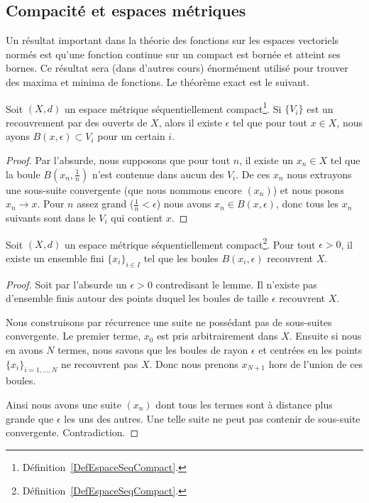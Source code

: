 \subsection{Compacité et espaces métriques}

Un résultat important dans la théorie des fonctions sur les espaces vectoriels normés est qu'une fonction continue sur un compact est bornée et atteint ses bornes. Ce résultat sera (dans d'autres cours) énormément utilisé pour trouver des maxima et minima de fonctions. Le théorème exact est le suivant.

\begin{lemma}    \label{LemQFXOWyx}
    Soit \( (X,d)\) un espace métrique séquentiellement compact\footnote{Définition~\ref{DefEspaceSeqCompact}.}. Si \( \{ V_i \}\) est un recouvrement par des ouverts de \( X\), alors il existe \( \epsilon\) tel que pour tout \( x\in X\), nous ayons \( B(x,\epsilon)\subset V_i\) pour un certain \( i\).
\end{lemma}

\begin{proof}
    Par l'absurde, nous supposons que pour tout \( n\), il existe un \( x_n\in X\) tel que la boule \( B(x_n,\frac{1}{ n })\) n'est contenue dans aucun des \( V_i\). De ces \( x_n\) nous extrayons une sous-suite convergente (que nous nommons encore \( (x_n)\)) et nous posons \( x_n\to x\). Pour \( n\) assez grand (\( \frac{1}{ n }<\epsilon\)) nous avons \( x_n\in B(x,\epsilon)\), donc tous les \( x_n\) suivants sont dans le \( V_i\) qui contient \( x\).
\end{proof}

\begin{lemma}   \label{LemMGQqgDG}
    Soit \( (X,d)\) un espace métrique séquentiellement compact\footnote{Définition~\ref{DefEspaceSeqCompact}.}. Pour tout \( \epsilon>0\), il existe un ensemble fini \( \{ x_i \}_{i\in I}\) tel que les boules \( B(x_i,\epsilon)\) recouvrent \( X\).
\end{lemma}

\begin{proof}
    Soit par l'absurde un \( \epsilon>0\) contredisant le lemme. Il n'existe pas d'ensemble finis autour des points duquel les boules de taille \( \epsilon\) recouvrent \( X\).

    Nous construisons par récurrence une suite ne possédant pas de sous-suites convergente. Le premier terme, \( x_0\) est pris arbitrairement dans \( X\). Ensuite si nous en avons \( N\) termes, nous savons que les boules de rayon \( \epsilon\) et centrées en les points \( \{ x_i \}_{i=1,\ldots, N}\) ne recouvrent pas \( X\). Donc nous prenons \( x_{N+1}\) hors de l'union de ces boules.

    Ainsi nous avons une suite \( (x_n)\) dont tous les termes sont à distance plus grande que \( \epsilon\) les uns des autres. Une telle suite ne peut pas contenir de sous-suite convergente. Contradiction.
\end{proof}

